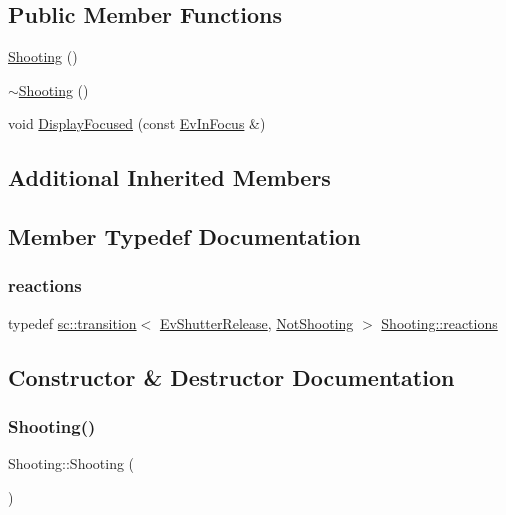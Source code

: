 \subsection*{Public Member Functions}
\begin{DoxyCompactItemize}
\item 
\mbox{\hyperlink{struct_shooting_a696d3e8d3cbfbce479f83c69f67a1736}{Shooting}} ()
\item 
\mbox{\hyperlink{struct_shooting_a99646488f60885e27785859da07f8c12}{$\sim$\+Shooting}} ()
\item 
void \mbox{\hyperlink{struct_shooting_aafe6cd0faff081f08f80d4528da4af6e}{Display\+Focused}} (const \mbox{\hyperlink{struct_ev_in_focus}{Ev\+In\+Focus}} \&)
\end{DoxyCompactItemize}
\subsection*{Additional Inherited Members}


\subsection{Member Typedef Documentation}
\mbox{\label{struct_shooting_a7c35ff4b8df15c37a351043f46f09ad3}} 
\subsubsection{\texorpdfstring{reactions}{reactions}}
{\footnotesize\ttfamily typedef \mbox{\hyperlink{classboost_1_1statechart_1_1transition}{sc\+::transition}}$<$ \mbox{\hyperlink{struct_ev_shutter_release}{Ev\+Shutter\+Release}}, \mbox{\hyperlink{struct_not_shooting}{Not\+Shooting}} $>$ \mbox{\hyperlink{struct_shooting_a7c35ff4b8df15c37a351043f46f09ad3}{Shooting\+::reactions}}}



\subsection{Constructor \& Destructor Documentation}
\mbox{\label{struct_shooting_a696d3e8d3cbfbce479f83c69f67a1736}} 
\subsubsection{\texorpdfstring{Shooting()}{Shooting()}}
{\footnotesize\ttfamily Shooting\+::\+Shooting (\begin{DoxyParamCaption}{ }\end{DoxyParamCaption})}

